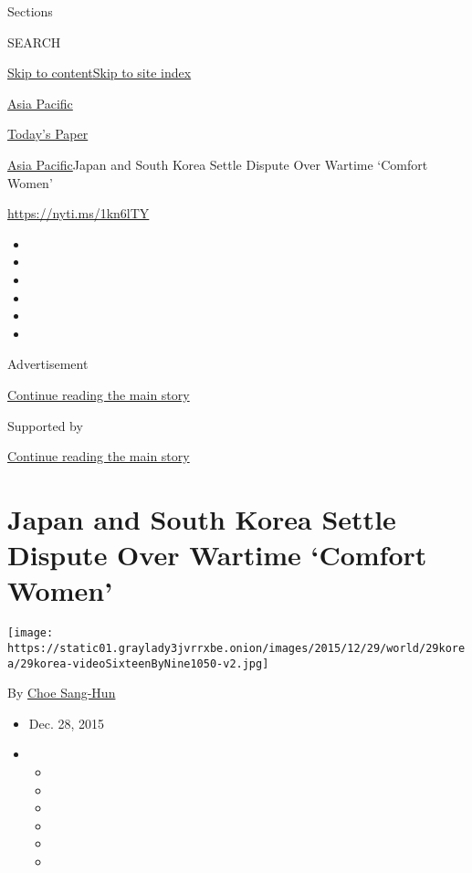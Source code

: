 Sections

SEARCH

\protect\hyperlink{site-content}{Skip to
content}\protect\hyperlink{site-index}{Skip to site index}

\href{https://www.nytimes3xbfgragh.onion/section/world/asia}{Asia
Pacific}

\href{https://myaccount.nytimes3xbfgragh.onion/auth/login?response_type=cookie\&client_id=vi}{}

\href{https://www.nytimes3xbfgragh.onion/section/todayspaper}{Today's
Paper}

\href{/section/world/asia}{Asia Pacific}\textbar{}Japan and South Korea
Settle Dispute Over Wartime `Comfort Women'

\url{https://nyti.ms/1kn6lTY}

\begin{itemize}
\item
\item
\item
\item
\item
\item
\end{itemize}

Advertisement

\protect\hyperlink{after-top}{Continue reading the main story}

Supported by

\protect\hyperlink{after-sponsor}{Continue reading the main story}

\hypertarget{japan-and-south-korea-settle-dispute-over-wartime-comfort-women}{%
\section{Japan and South Korea Settle Dispute Over Wartime `Comfort
Women'}\label{japan-and-south-korea-settle-dispute-over-wartime-comfort-women}}

\texttt{[image: https://static01.graylady3jvrrxbe.onion/images/2015/12/29/world/29korea/29korea-videoSixteenByNine1050-v2.jpg]}

By \href{http://www.nytimes3xbfgragh.onion/by/choe-sang-hun}{Choe
Sang-Hun}

\begin{itemize}
\item
  Dec. 28, 2015
\item
  \begin{itemize}
  \item
  \item
  \item
  \item
  \item
  \item
  \end{itemize}
\end{itemize}

